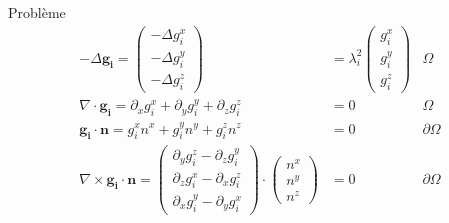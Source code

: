 \documentclass{beamer}
\newcommand{\laplace}{{\Delta}}
\newcommand{\rot}{{\nabla\times}}
\renewcommand{\div}{{\nabla\cdot}}
\begin{document}
\begin{frame}{Problème}
\begin{align}
-\laplace\bm{g_i}=\begin{pmatrix}-\laplace g_i^x\\-\laplace g_i^y\\-\laplace g_i^z\end{pmatrix}&=\lambda_i^2\begin{pmatrix}g_i^x\\g_i^y\\g_i^z\end{pmatrix} & \Omega\\
\div\bm{g_i}=\partial_x g_i^x+\partial_y g_i^y + \partial_z g_i^z &= 0 &\Omega \label{contdiv}\\
\bm{g_i}\cdot\bm{n} = g_i^xn^x + g_i^yn^y + g_i^zn^z &= 0 &\partial\Omega \label{bc1}\\
\rot\bm{g_i}\cdot \bm{n} = \begin{pmatrix}
\partial_y g_i^z - \partial_z g_i^y\\
\partial_z g_i^x - \partial_x g_i^z\\
\partial_x g_i^y - \partial_y g_i^x
\end{pmatrix}\cdot\begin{pmatrix}n^x\\n^y\\n^z\end{pmatrix} &= 0 &\partial\Omega \label{bc2}
\end{align}
\end{frame}
\end{document}
